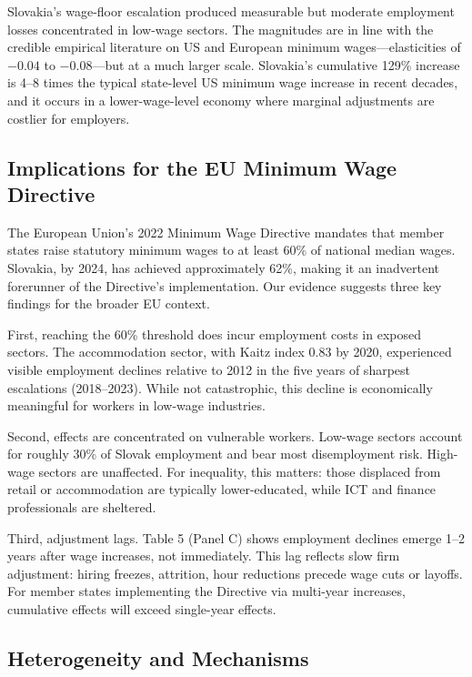 \documentclass[12pt]{article}
\begin{document}
Slovakia's wage-floor escalation produced measurable but moderate employment losses concentrated in low-wage sectors. The magnitudes are in line with the credible empirical literature on US and European minimum wages---elasticities of $-0.04$ to $-0.08$---but at a much larger scale. Slovakia's cumulative 129\% increase is 4--8 times the typical state-level US minimum wage increase in recent decades, and it occurs in a lower-wage-level economy where marginal adjustments are costlier for employers.

\subsection*{Implications for the EU Minimum Wage Directive}

The European Union's 2022 Minimum Wage Directive mandates that member states raise statutory minimum wages to at least 60\% of national median wages. Slovakia, by 2024, has achieved approximately 62\%, making it an inadvertent forerunner of the Directive's implementation. Our evidence suggests three key findings for the broader EU context.

First, reaching the 60\% threshold does incur employment costs in exposed sectors. The accommodation sector, with Kaitz index 0.83 by 2020, experienced visible employment declines relative to 2012 in the five years of sharpest escalations (2018--2023). While not catastrophic, this decline is economically meaningful for workers in low-wage industries.

Second, effects are concentrated on vulnerable workers. Low-wage sectors account for roughly 30\% of Slovak employment and bear most disemployment risk. High-wage sectors are unaffected. For inequality, this matters: those displaced from retail or accommodation are typically lower-educated, while ICT and finance professionals are sheltered.

Third, adjustment lags. Table 5 (Panel C) shows employment declines emerge 1--2 years after wage increases, not immediately. This lag reflects slow firm adjustment: hiring freezes, attrition, hour reductions precede wage cuts or layoffs. For member states implementing the Directive via multi-year increases, cumulative effects will exceed single-year effects.

\subsection*{Heterogeneity and Mechanisms}
\end{document}
